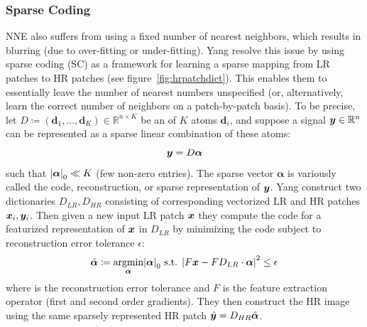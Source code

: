 \subsubsection{Sparse Coding}\label{subsubsec:sparsecoding}
NNE also suffers from using a fixed number of nearest neighbors, which results in blurring (due to over-fitting or under-fitting).
%
Yang \etal \cite{yang2008} resolve this issue by using sparse coding (SC) as a framework for learning a sparse mapping from LR patches to HR patches (see figure~\ref{fig:hrpatchdict}).
%
This enables them to essentially leave the number of nearest numbers unspecified (or, alternatively, learn the correct number of neighbors on a patch-by-patch basis).
%
To be precise, let \(D \coloneqq \left(\bm{d}_1, \dots, \bm{d}_K \right) \in \mathbb{R}^{n \times K}\) be an  of \(K\) atoms \(\bm{d}_i\), and suppose a signal \(\bm{y} \in \mathbb{R}^n\) can be represented as a sparse linear combination of these atoms:
\begin{equation}
    \bm{y} = D\bm{\alpha}
\end{equation}
such that \(\abs{ \bm{\alpha} }_0 \ll K\) (few non-zero entries).
%
The sparse vector \(\bm{\alpha}\) is variously called the code, reconstruction, or sparse representation of \(\bm{y}\).
%
Yang \etal construct two dictionaries \(D_{LR}, D_{HR}\) consisting of corresponding vectorized LR and HR patches \(\bm{x}_i, \bm{y}_i\).
%
Then given a new input LR patch \(\bm{x}\) they compute the code for a featurized representation of \(\bm{x}\) in \(D_{LR}\) by minimizing the code subject to reconstruction error tolerance \(\epsilon\):
\begin{equation}
    \hat{\bm{\alpha}} \coloneqq \underset{\bm{\alpha}}{\text{argmin}} \abs{ \bm{\alpha} }_0 \text{ s.t. } \abs{ F\bm{x} - FD_{LR} \cdot \bm{\alpha} }^2 \leq \epsilon
    \label{eqn:constrainedrepr}
\end{equation}
where  is the reconstruction error tolerance and \(F\) is the feature extraction operator (first and second order gradients).
%
They then construct the HR image using the same sparsely represented HR patch \(\hat{\bm{y}} = D_{HR} \hat{\bm{\alpha}}\).

